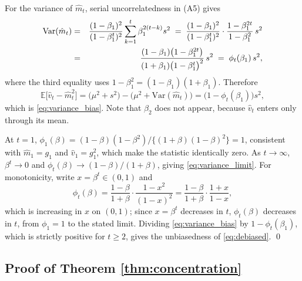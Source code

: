 \documentclass[pdflatex,sn-mathphys-num]{sn-jnl}%
\theoremstyle{thmstyleone}%
\theoremstyle{thmstyletwo}%
\theoremstyle{thmstylethree}%
\newcommand{\Var}{\mathrm{Var}}
\newcommand{\E}{\mathbb{E}}
\begin{document}
\begin{appendices}
For the variance of $\hat m_t$, serial uncorrelatedness in (A5) gives
\begin{eqnarray}
\Var(\hat m_t)
&=&
\frac{(1-\beta_1)^2}{(1-\beta_1^{t})^{2}}\sum_{k=1}^{t}\beta_1^{2(t-k)}s^2
\;=\;
\frac{(1-\beta_1)^2}{(1-\beta_1^{t})^{2}}\cdot\frac{1-\beta_1^{2t}}{1-\beta_1^{2}}\,s^2
\cr
&=&
\frac{(1-\beta_1)\bigl(1-\beta_1^{2t}\bigr)}{(1+\beta_1)\bigl(1-\beta_1^{t}\bigr)^{2}}\,s^2
\;=\;
\phi_t(\beta_1)\,s^2 ,
\end{eqnarray}
where the third equality uses $1-\beta_1^2=(1-\beta_1)(1+\beta_1)$. Therefore
\begin{equation}
\E\bigl[\hat v_t-\hat m^2_t\bigr]
=
\bigl(\mu^2+s^2\bigr)-\bigl(\mu^2+\Var(\hat m_t)\bigr)
=
\bigl(1-\phi_t(\beta_1)\bigr)s^2 ,
\end{equation}
which is \eqref{eq:variance_bias}. Note that $\beta_2$ does not appear, because $\hat v_t$ enters only through its mean.

At $t=1$, $\phi_1(\beta)=(1-\beta)(1-\beta^2)/\{(1+\beta)(1-\beta)^2\}=1$, consistent with $\hat m_1=g_1$ and $\hat v_1=g_1^2$, which make the statistic identically zero. As $t\to\infty$, $\beta^t\to0$ and $\phi_t(\beta)\to(1-\beta)/(1+\beta)$, giving \eqref{eq:variance_limit}. For monotonicity, write $x=\beta^{t}\in(0,1)$ and
\begin{equation}
\phi_t(\beta)=\frac{1-\beta}{1+\beta}\cdot\frac{1-x^{2}}{(1-x)^{2}}
=\frac{1-\beta}{1+\beta}\cdot\frac{1+x}{1-x},
\end{equation}
which is increasing in $x$ on $(0,1)$; since $x=\beta^{t}$ decreases in $t$, $\phi_t(\beta)$ decreases in $t$, from $\phi_1=1$ to the stated limit. Dividing \eqref{eq:variance_bias} by $1-\phi_t(\beta_1)$, which is strictly positive for $t\ge2$, gives the unbiasedness of \eqref{eq:debiased}. \qed

\subsection*{Proof of Theorem \ref{thm:concentration}}


\end{appendices}
\end{document}
